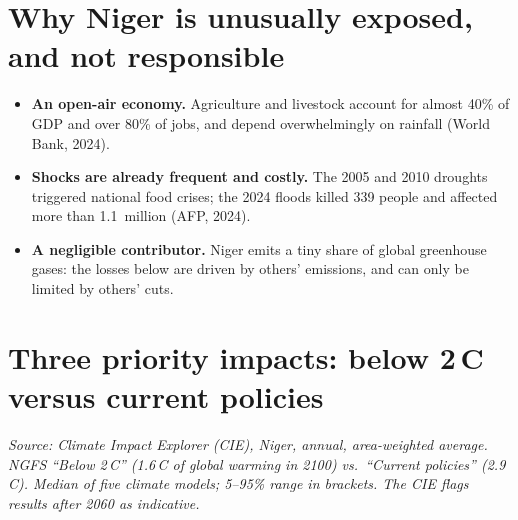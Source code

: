 \documentclass[10pt,a4paper]{article}
\newcommand{\degC}{\,\textdegree C}
\begin{document}
\section{Why Niger is unusually exposed, and not responsible}
\begin{itemize}
  \item \textbf{An open-air economy.} Agriculture and livestock account for almost 40\% of GDP and
        over 80\% of jobs, and depend overwhelmingly on rainfall (World Bank, 2024).
  \item \textbf{Shocks are already frequent and costly.} The 2005 and 2010 droughts triggered national
        food crises; the 2024 floods killed 339 people and affected more than 1.1~million (AFP, 2024).
  \item \textbf{A negligible contributor.} Niger emits a tiny share of global greenhouse gases: the losses
        below are driven by others' emissions, and can only be limited by others' cuts.
\end{itemize}

\section{Three priority impacts: below 2\degC{} versus current policies}
{\footnotesize\itshape Source: Climate Impact Explorer (CIE), Niger, annual, area-weighted average. NGFS
``Below 2\degC'' (1.6\degC{} of global warming in 2100) vs.\ ``Current policies'' (2.9\degC). Median of five
climate models; 5--95\% range in brackets. The CIE flags results after 2060 as indicative.\par}
\vspace{3pt}
\end{document}
